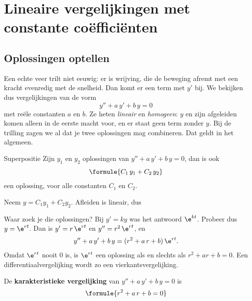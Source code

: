 \section{Lineaire vergelijkingen met constante coëfficiënten}

\subsection{Oplossingen optellen}

Een echte veer trilt niet eeuwig: er is wrijving, die de beweging afremt met een kracht evenredig met de snelheid. Dan komt er een term met $y'$ bij. We bekijken dus vergelijkingen van de vorm
\[
y'' + a\,y' + b\,y = 0
\]
met reële constanten $a$ en $b$. Ze heten \textit{lineair} en \textit{homogeen}: $y$ en zijn afgeleiden komen alleen in de eerste macht voor, en er staat geen term zonder $y$. Bij de trilling zagen we al dat je twee oplossingen mag combineren. Dat geldt in het algemeen.

\begin{theorie}
\begin{stelling}{Superpositie}
Zijn $y_1$ en $y_2$ oplossingen van $y'' + a\,y' + b\,y = 0$, dan is ook
\[
\formule{C_1\,y_1 + C_2\,y_2}
\]
een oplossing, voor alle constanten $C_1$ en $C_2$.
\end{stelling}

\begin{bewijs}
Neem $y = C_1 y_1 + C_2 y_2$. Afleiden is lineair, dus
\end{bewijs}
\end{theorie}

Waar zoek je die oplossingen? Bij $y' = ky$ was het antwoord $\e^{kt}$. Probeer dus $y = \e^{rt}$. Dan is $y' = r\,\e^{rt}$ en $y'' = r^2\,\e^{rt}$, en
\[
y'' + a\,y' + b\,y = (r^2 + a\,r + b)\,\e^{rt} .
\]
Omdat $\e^{rt}$ nooit 0 is, is $\e^{rt}$ een oplossing als en slechts als $r^2 + ar + b = 0$. Een differentiaalvergelijking wordt zo een vierkantsvergelijking.

\begin{theorie}
De \textbf{\textcolor{accent}{karakteristieke vergelijking}} van $y'' + a\,y' + b\,y = 0$ is
\[
\formule{r^2 + a\,r + b = 0}
\]
\end{theorie}

\begin{oefeningen}
\end{oefeningen}

